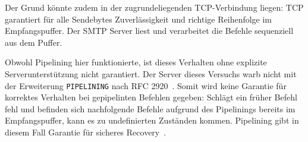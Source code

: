 Der Grund könnte zudem in der zugrundeliegenden TCP-Verbindung liegen: TCP garantiert für alle Sendebytes Zuverlässigkeit und richtige Reihenfolge im Empfangspuffer.
Der SMTP Server liest und verarbeitet die Befehle sequenziell aus dem Puffer.

Obwohl Pipelining hier funktionierte, ist dieses Verhalten ohne explizite Serverunterstützung nicht garantiert.
Der Server dieses Versuchs warb nicht mit der Erweiterung \texttt{PIPELINING} nach RFC 2920~\cite{rfc2920_smtp_pipelining}.
Somit wird keine Garantie für korrektes Verhalten bei gepipelinten Befehlen gegeben:
Schlägt ein früher Befehl fehl und befinden sich nachfolgende Befehle aufgrund des Pipelinings bereits im Empfangspuffer, kann es zu undefinierten Zuständen kommen.
Pipelining gibt in diesem Fall Garantie für sicheres Recovery~\cite{rfc2920_smtp_pipelining}.
